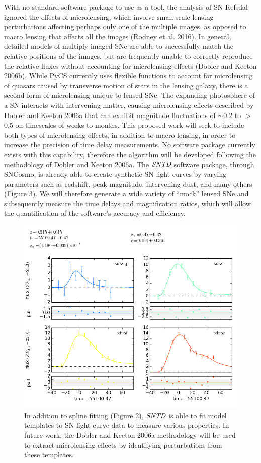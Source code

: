 With no standard software package to use as a tool, the analysis of SN Refsdal ignored the effects of microlensing, which involve small-scale lensing perturbations affecting perhaps only one of the multiple images, as opposed to macro lensing that affects all the images (Rodney et al. 2016). In general, detailed models of multiply imaged SNe are able to successfully match the relative positions of the images, but are frequently unable to correctly reproduce the relative fluxes without accounting for microlensing effects (Dobler and Keeton 2006b). While PyCS currently uses flexible functions to account for microlensing of quasars caused by transverse motion of stars in the lensing galaxy, there is a second form of microlensing unique to lensed SNe. The expanding photosphere of a SN interacts with intervening matter, causing microlensing effects described by Dobler and Keeton 2006a that can exhibit magnitude fluctuations of $\sim$0.2 to $>$0.5 on timescales of weeks to months. This proposed work will seek to include both types of microlensing effects, in addition to macro lensing, in order to increase the precision of time delay measurements. No software package currently exists with this capability, therefore the algorithm will be developed following the methodology of Dobler and Keeton 2006a. 
The $\textit{SNTD}$ software package, through SNCosmo, is already able to create synthetic SN light curves by varying parameters such as redshift, peak magnitude, intervening dust, and many others (Figure 3). We will therefore generate a wide variety of ``mock'' lensed SNe and subsequently measure the time delays and magnification ratios, which will allow the quantification of the software's accuracy and efficiency. 

\begin{figure}[h]
\centering
\includegraphics[scale=.4]{sncosmo.png}
\caption{In addition to spline fitting (Figure 2), $\textit{SNTD}$ is able to fit model templates to SN light curve data to measure various properties. In future work, the Dobler and Keeton 2006a methodology will be used to extract microlensing effects by identifying perturbations from these templates.}
\end{figure}

